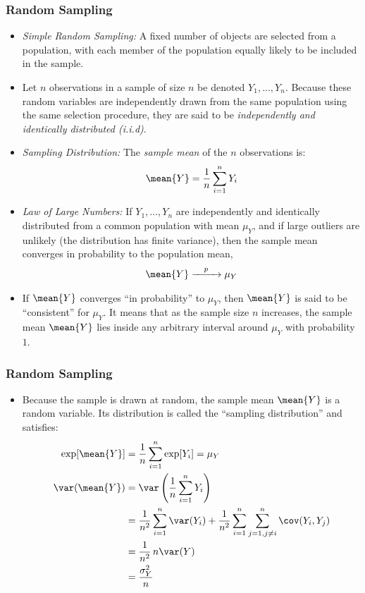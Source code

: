 

\begin{frame}
\frametitle{Random Sampling}
\begin{itemize}
\item \emph{Simple Random Sampling:} A fixed number of objects are selected from a population, with each member of the population equally likely to be included in the sample.
\item Let $n$ observations in a sample of size $n$ be denoted $Y_1,\ldots,Y_n$. Because these random variables are independently drawn from the same population using the same selection procedure, they are said to be \textit{independently and identically distributed (i.i.d)}.
\item \emph{Sampling Distribution:} The \textit{sample mean} of the $n$ observations is:
\begin{align*}
\mean{Y} = \frac{1}{n} \sum_{i=1}^n Y_i
\end{align*}
\item \emph{Law of Large Numbers:} If $Y_1,\ldots,Y_n$ are independently and identically distributed from a common population with mean $\mu_Y$, and if large outliers are unlikely (the distribution has finite variance), then the sample mean converges in probability to the population mean,
\begin{align*}
\mean{Y} \xrightarrow{\quad p \quad} \mu_Y 
\end{align*}
\item If $\mean{Y}$ converges ``in probability'' to $\mu_Y$, then $\mean{Y}$ is said to be ``consistent'' for $\mu_Y$. It means that as the sample size $n$ increases, the sample mean $\mean{Y}$ lies inside any arbitrary interval around $\mu_Y$ with probability $1$.
\end{itemize}
\end{frame}


\begin{frame}
\frametitle{Random Sampling}
\begin{itemize}
\item Because the sample is drawn at random, the sample mean $\mean{Y}$ is a random variable. Its distribution is called the ``sampling distribution'' and satisfies:
\begin{align*}
\exp[\mean{Y}] 
  & = \frac{1}{n} \sum_{i=1}^n \exp[Y_i] 
    = \mu_Y \\
\var(\mean{Y}) 
  & = \var\left(\frac{1}{n}\sum_{i=1}^n Y_i\right)\\
  & = \frac{1}{n^2}\sum_{i=1}^n\var(Y_i) + 		
      \frac{1}{n^2}\sum_{i=1}^n\sum_{j=1,j\ne{i}}^n\cov(Y_i, Y_j)\\
  & = \frac{1}{n^2} \, n\var(Y)\\
  & = \frac{\sigma^2_Y}{n}
\end{align*}
\end{itemize}
\end{frame}


